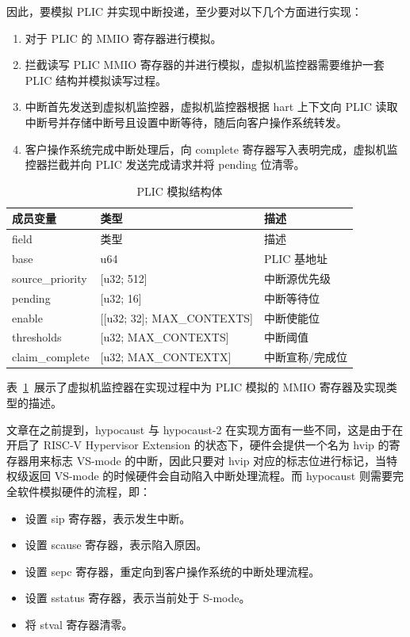 因此，要模拟 PLIC 并实现中断投递，至少要对以下几个方面进行实现：
\begin{enumerate}
    \item 对于 PLIC 的 MMIO 寄存器进行模拟。
    \item 拦截读写 PLIC MMIO 寄存器的并进行模拟，虚拟机监控器需要维护一套 PLIC 结构并模拟读写过程。
    \item 中断首先发送到虚拟机监控器，虚拟机监控器根据 hart 上下文向 PLIC 读取中断号并存储中断号且设置中断等待，随后向客户操作系统转发。
    \item 客户操作系统完成中断处理后，向 complete 寄存器写入表明完成，虚拟机监控器拦截并向 PLIC 发送完成请求并将 pending 位清零。
\end{enumerate}

\begin{table}[htbp]
    \caption{PLIC 模拟结构体}\label{tab:table4}
    \vspace{0.5em}\centering\wuhao
    \begin{tabular}{p{5cm}p{5cm}p{5cm}}
    \toprule[1.5pt]
    成员变量&类型&描述\\
    \midrule[1pt]
    field&类型&描述\\
    base&u64&PLIC 基地址\\
    source\_priority&[u32; 512]&中断源优先级\\
    pending&[u32; 16]&中断等待位\\
    enable&[[u32; 32]; MAX\_CONTEXTS]&中断使能位\\
    thresholds&[u32; MAX\_CONTEXTS]&中断阈值\\
    claim\_complete&[u32; MAX\_CONTEXTX]&中断宣称/完成位\\
    \bottomrule[1.5pt]
    \end{tabular}
    \vspace{\baselineskip}
    \end{table}

表~\ref{tab:table4}~展示了虚拟机监控器在实现过程中为 PLIC 模拟的 MMIO 寄存器及实现类型的描述。

文章在之前提到，hypocaust 与 hypocaust-2 在实现方面有一些不同，这是由于在开启了 RISC-V Hypervisor Extension 的状态下，硬件会提供一个名为 hvip 的寄存器用来标志 VS-mode 的中断，因此只要对 hvip 对应的标志位进行标记，当特权级返回 VS-mode 的时候硬件会自动陷入中断处理流程。而 hypocaust 则需要完全软件模拟硬件的流程，即：
\begin{itemize}
    \item 设置 sip 寄存器，表示发生中断。
    \item 设置 scause 寄存器，表示陷入原因。
    \item 设置 sepc 寄存器，重定向到客户操作系统的中断处理流程。
    \item 设置 sstatus 寄存器，表示当前处于 S-mode。
    \item 将 stval 寄存器清零。
\end{itemize}

